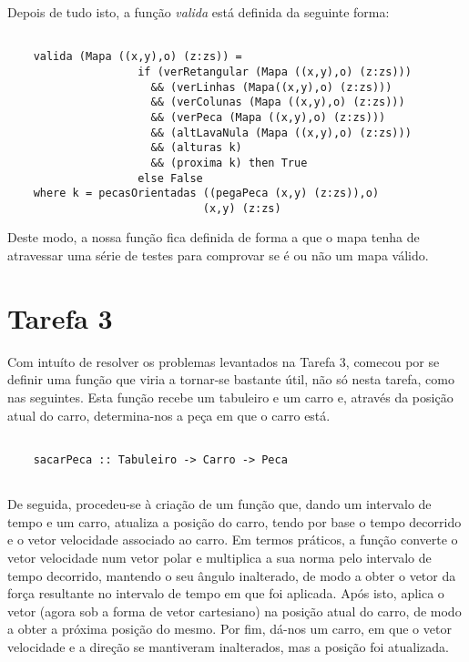 \documentclass[a4paper]{report} %
\begin{document}
  \par \noindent Depois de tudo isto, a função \textit{valida} está definida da seguinte forma:

  \begin{verbatim}

    valida (Mapa ((x,y),o) (z:zs)) = 
                    if (verRetangular (Mapa ((x,y),o) (z:zs)))
                      && (verLinhas (Mapa((x,y),o) (z:zs)))
                      && (verColunas (Mapa ((x,y),o) (z:zs)))
                      && (verPeca (Mapa ((x,y),o) (z:zs)))
                      && (altLavaNula (Mapa ((x,y),o) (z:zs)))
                      && (alturas k)
                      && (proxima k) then True
                    else False
    where k = pecasOrientadas ((pegaPeca (x,y) (z:zs)),o) 
                              (x,y) (z:zs)

  \end{verbatim}

  Deste modo, a nossa função fica definida de forma a que o mapa tenha de atravessar uma série de testes para comprovar se é ou não um mapa válido.
  
  \newpage

  \section{Tarefa 3}

  \par \noindent Com intuíto de resolver os problemas levantados na Tarefa 3, comecou por se definir uma função que viria a tornar-se bastante útil, não só nesta tarefa, como nas seguintes. Esta função recebe um tabuleiro e um carro e, através da posição atual do carro, determina-nos a peça em que o carro está.

  \begin{verbatim}
    
    sacarPeca :: Tabuleiro -> Carro -> Peca
    
  \end{verbatim}

  \par \noindent De seguida, procedeu-se à criação de um função que, dando um intervalo de tempo e um carro, atualiza a posição do carro, tendo por base o tempo decorrido e o vetor velocidade associado ao carro. Em termos práticos, a função converte o vetor velocidade num vetor polar e multiplica a sua norma pelo intervalo de tempo decorrido, mantendo o seu ângulo inalterado, de modo a obter o vetor da força resultante no intervalo de tempo em que foi aplicada. Após isto, aplica o vetor (agora sob a forma de vetor cartesiano) na posição atual do carro, de modo a obter a próxima posição do mesmo. Por fim, dá-nos um carro, em que o vetor velocidade e a direção se mantiveram inalterados, mas a posição foi atualizada.
\end{document}
